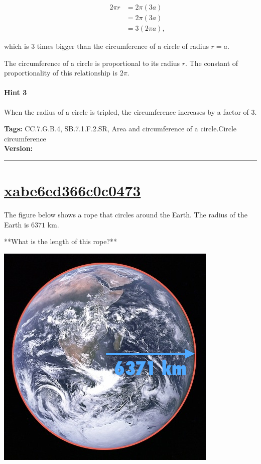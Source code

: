 \documentclass[twocolumn,10pt]{article}
\def\shrinkfactor{0.45}
\begin{document}
\begin{align*}
\qquad 
 2\pi r & =2\pi (3a)  \\
  & =2\pi(3a) \\
  &= 3(2\pi a),
\end{align*}   

which is $3$ times bigger than the circumference of a circle of radius $r=a$. 

The circumference of a circle is proportional to its radius $r$. The constant of proportionality of this relationship is $2\pi$.

\paragraph{Hint 3}When the radius of a circle is tripled, the circumference increases by a factor of $3$.



\medskip
\noindent
\textbf{Tags:} {\footnotesize CC.7.G.B.4, SB.7.1.F.2.SR, Area and circumference of a circle.Circle circumference}\\
\textbf{Version:} \DIFdelbegin {}\DIFdelend \DIFaddbegin {}\DIFaddend \smallskip\hrule





\section{\href{https://www.khanacademy.org/devadmin/content/items/xabe6ed366c0c0473}{xabe6ed366c0c0473}}

\noindent
The figure below shows a rope that circles around the Earth. The radius of the Earth is $6371\text{ km}$.

**What is the length of this rope?**


\includegraphics[scale=\shrinkfactor]{figures/b13ca0ce2e95cd21069652083e018a8c654aafe8.png}
\end{document}
